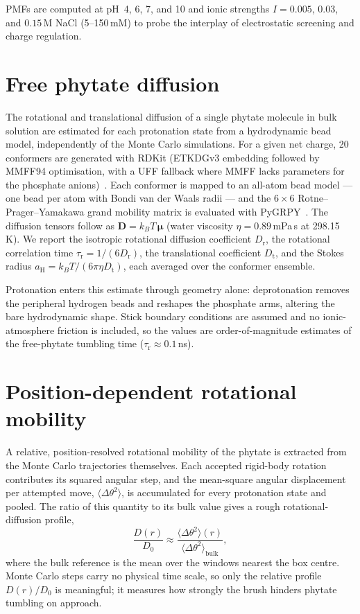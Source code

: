 \documentclass[11pt]{article}
\begin{document}
PMFs are computed at pH~4, 6, 7, and 10 and ionic strengths
$I = 0.005$, $0.03$, and $0.15$\,M NaCl (5--150\,mM) to probe the
interplay of electrostatic screening and charge regulation.

\section{Free phytate diffusion}

The rotational and translational diffusion of a single phytate molecule in
bulk solution are estimated for each protonation state from a hydrodynamic
bead model, independently of the Monte Carlo simulations.  For a given net
charge, 20 conformers are generated with RDKit (ETKDGv3 embedding followed by
MMFF94 optimisation, with a UFF fallback where MMFF lacks parameters for the
phosphate anions)~\cite{RDKit}.  Each conformer is mapped to an all-atom bead
model --- one bead per atom with Bondi van der Waals radii --- and the
$6\times6$ Rotne--Prager--Yamakawa grand mobility matrix is evaluated with
PyGRPY~\cite{Zuk2018,Waszkiewicz2023}.  The diffusion tensors follow as
$\mathbf{D} = k_BT\,\boldsymbol{\mu}$ (water viscosity $\eta = 0.89$\,mPa\,s at
298.15\,K).  We report the isotropic rotational diffusion coefficient
$D_\text{r}$, the rotational correlation time $\tau_\text{r} = 1/(6D_\text{r})$,
the translational coefficient $D_\text{t}$, and the Stokes radius
$a_\text{H} = k_BT/(6\pi\eta D_\text{t})$, each averaged over the conformer
ensemble.

Protonation enters this estimate through geometry alone: deprotonation removes
the peripheral hydrogen beads and reshapes the phosphate arms, altering the
bare hydrodynamic shape.  Stick boundary conditions are assumed and no
ionic-atmosphere friction is included, so the values are order-of-magnitude
estimates of the free-phytate tumbling time ($\tau_\text{r}\approx0.1$\,ns).

\section{Position-dependent rotational mobility}

A relative, position-resolved rotational mobility of the phytate is extracted
from the Monte Carlo trajectories themselves.  Each accepted rigid-body
rotation contributes its squared angular step, and the mean-square angular
displacement per attempted move, $\langle\Delta\theta^2\rangle$, is accumulated
for every protonation state and pooled.  The ratio of this quantity to its bulk
value gives a rough rotational-diffusion profile,
\begin{equation}
\frac{D(r)}{D_0} \approx
\frac{\langle\Delta\theta^2\rangle(r)}{\langle\Delta\theta^2\rangle_\text{bulk}},
\end{equation}
where the bulk reference is the mean over the windows nearest the box centre.
Monte Carlo steps carry no physical time scale, so only the relative profile
$D(r)/D_0$ is meaningful; it measures how strongly the brush hinders phytate
tumbling on approach.
\end{document}
